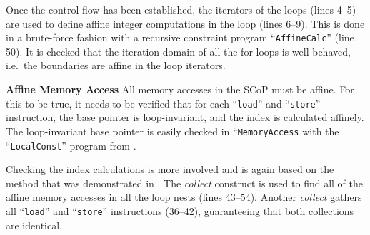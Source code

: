     Once the control flow has been established, the iterators of the loops
    (lines 4--5) are used to define affine integer computations in the loop
    (lines 6--9).
    This is done in a brute-force fashion with a recursive constraint program
    ``{\tt AffineCalc}'' (line 50).
    It is checked that the iteration domain of all the for-loops is
    well-behaved, i.e.\ the boundaries are affine in the loop iterators.

    \vspace{2mm}
    \noindent
    \textbf{Affine Memory Access}
    All memory accesses in the SCoP must be affine.
    For this to be true, it needs to be verified that for each ``{\tt load}''
    and ``{\tt store}'' instruction, the base pointer is loop-invariant, and the
    index is calculated affinely.
    The loop-invariant base pointer is easily checked in ``{\tt MemoryAccess}
    with the ``{\tt LocalConst}'' program from .

    Checking the index calculations is more involved and is again based on the
    method that was demonstrated in .
    The {\it collect} construct is used to find all of the affine memory
    accesses in all the loop nests (lines 43--54).
    Another {\it collect} gathers all ``{\tt load}'' and ``{\tt store}''
    instructions (36--42), guaranteeing that both collections are identical.

